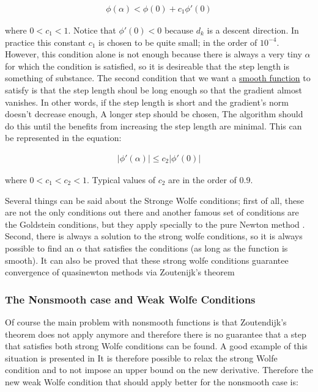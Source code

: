\begin{equation} \label{armijo}
  \begin{aligned}
    \phi (\alpha) < \phi(0) + c_1 \phi'(0)
  \end{aligned}
\end{equation}

where $0  < c_1 < 1$. Notice that $\phi'(0) < 0$ because $d_k$ is a descent direction. In practice this constant $c_1$ is chosen to be quite small;  in the order of $10^{-4}$. However, this condition alone is not enough because there is always a very tiny $\alpha$ for which the condition is satisfied,  so it is desireable that the step length is something of substance. The second condition that we want a \underline{smooth function} to satisfy is that the step length shoul be long enough so that the gradient almost vanishes. In other words, if the step length is short and the gradient's norm doesn't decrease enough, A longer step should be chosen,  The algorithm should do this until the benefits from increasing the step length are minimal. This can be represented in the equation:

\begin{equation} \label{strongWolfe}
  \begin{aligned}
    |\phi'(\alpha)| \leq c_2|\phi'(0)| 
  \end{aligned}
\end{equation}

where $0 < c_1 < c_2 < 1$. Typical values of $c_2$ are in the order of $0.9$.

Several things can be said about the Stronge Wolfe conditions; first of all, these are not the only conditions out there and another famous set of conditions are the Goldstein conditions, but they apply specially to the pure Newton method \citep{nocedal}. Second, there is always a solution to the strong wolfe conditions, so it is always possible to find an $\alpha$ that satisfies the conditions (as long as the function is smooth). It can also be proved that these strong wolfe conditions guarantee convergence of quasinewton methods via Zoutenijk's theorem \citep{zoutendijk}

\subsubsection{The Nonsmooth case and Weak Wolfe Conditions}

Of course the main problem with nonsmooth functions is that Zoutendijk's theorem does not apply anymore and therefore there is no guarantee that a step that satisfies both strong Wolfe conditions can be found. A good example of this situation is presented in \citep{skaaja}  It is therefore possible to relax the strong Wolfe condition and to not impose an upper bound on the new derivative. Therefore the new weak Wolfe condition that should apply better for the nonsmooth case is: 

